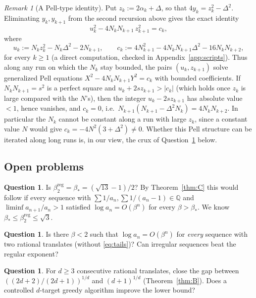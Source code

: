 \documentclass[11pt]{amsart}
\theoremstyle{definition}
\newtheorem{question}[lemma]{Question}
\theoremstyle{remark}
\newtheorem{remark}[lemma]{Remark}
\newcommand{\Q}{\mathbb{Q}}
\begin{document}
\begin{remark}[A Pell-type identity]\label{rem:pell}
Put $z_k:=2\alpha_k+\Delta$, so that $4y_k=z_k^2-\Delta^2$. Eliminating $y_k,y_{k+1}$
from the second recursion above gives the exact identity
\[
u_k^2-4N_kN_{k+1}\,z_{k+1}^2=c_k,
\]
where
\[
u_k:=N_kz_k^2-N_k\Delta^2-2N_{k+1},\qquad c_k:=4N_{k+1}^2-4N_kN_{k+1}\Delta^2-16N_kN_{k+2},
\]
for every $k\ge1$ (a direct computation, checked in Appendix~\ref{app:scripts}). Thus
along any run on which the $N_k$ stay bounded, the pairs $(u_k,z_{k+1})$ solve
generalized Pell equations $X^2-4N_kN_{k+1}Y^2=c_k$ with bounded coefficients. If
$N_kN_{k+1}=s^2$ is a perfect square and $u_k+2sz_{k+1}>|c_k|$ (which holds once $z_k$
is large compared with the $N$'s), then the integer $u_k-2sz_{k+1}$ has absolute value
$<1$, hence vanishes, and $c_k=0$, i.e.\ $N_{k+1}(N_{k+1}-\Delta^2N_k)=4N_kN_{k+2}$. In
particular the $N_k$ cannot be constant along a run with large $z_k$, since a constant
value $N$ would give $c_k=-4N^2(3+\Delta^2)\neq0$. Whether this Pell structure can be
iterated along long runs is, in our view, the crux of Question~\ref{q:irregular} below.
\end{remark}

\subsection{Open problems}

\begin{question}\label{q:reg}
Is $\beta_2^{\mathrm{reg}}=\beta_*=(\sqrt{13}-1)/2$? By Theorem~\ref{thm:C} this would
follow if every sequence with $\sum1/a_n,\sum1/(a_n-1)\in\Q$ and
$\liminf a_{n+1}/a_n>1$ satisfied $\log a_n=O(\beta^n)$ for every $\beta>\beta_*$. We
know $\beta_*\le\beta_2^{\mathrm{reg}}\le\sqrt3$.
\end{question}

\begin{question}\label{q:irregular}
Is there $\beta<2$ such that $\log a_n=O(\beta^n)$ for \emph{every} sequence with two
rational translates (without \eqref{eq:tails})? Can irregular sequences beat the regular
exponent?
\end{question}

\begin{question}\label{q:d}
For $d\ge3$ consecutive rational translates, close the gap between
$((2d+2)/(2d+1))^{1/d}$ \cite{KT25} and $(d+1)^{1/d}$ (Theorem~\ref{thm:B}). Does a
controlled $d$-target greedy algorithm improve the lower bound?
\end{question}
\end{document}
